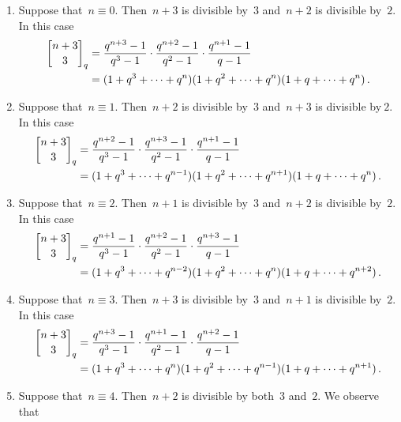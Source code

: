 \documentclass[a4paper,11pt]{scrartcl}
\begin{document}
\begin{enumerate}[label = {Case \arabic*.}]
  \item
    Suppose that~$n \equiv 0$.
    Then~$n+3$ is divisible by~$3$ and~$n+2$ is divisible by~$2$.
    In this case
    \begin{align*}
      \qbinom{n+3}{3}_q
      &=
      \frac{ q^{n+3} - 1 }{ q^3 - 1 }
      \cdot
      \frac{ q^{n+2} - 1 }{ q^2 - 1 }
      \cdot
      \frac{ q^{n+1} - 1 }{ q - 1 }
      \\
      &=
      (1 + q^3 + \dotsb + q^n) (1 + q^2 + \dotsb + q^n) (1 + q + \dotsb + q^n) \,.
    \end{align*}
  \item
    Suppose that~$n \equiv 1$.
    Then~$n+2$ is divisible by~$3$ and~$n+3$ is divisible by$~2$.
    In this case
    \begin{align*}
      \qbinom{n+3}{3}_q
      &=
      \frac{ q^{n+2} - 1 }{ q^3 - 1 }
      \cdot
      \frac{ q^{n+3} - 1 }{ q^2 - 1 }
      \cdot
      \frac{ q^{n+1} - 1 }{ q - 1 }
      \\
      &=
      (1 + q^3 + \dotsb + q^{n-1}) (1 + q^2 + \dotsb + q^{n+1}) (1 + q + \dotsb + q^n) \,.
    \end{align*}
  \item
    Suppose that~$n \equiv 2$.
    Then~$n+1$ is divisible by~$3$ and~$n+2$ is divisible by~$2$.
    In this case
    \begin{align*}
      \qbinom{n+3}{3}_q
      &=
      \frac{ q^{n+1} - 1 }{ q^3 - 1 }
      \cdot
      \frac{ q^{n+2} - 1 }{ q^2 - 1 }
      \cdot
      \frac{ q^{n+3} - 1 }{ q - 1 }
      \\
      &=
      (1 + q^3 + \dotsb + q^{n-2}) (1 + q^2 + \dotsb + q^n) (1 + q + \dotsb + q^{n+2}) \,.
    \end{align*}
  \item
    Suppose that~$n \equiv 3$.
    Then~$n+3$ is divisible by~$3$ and~$n+1$ is divisible by~$2$.
    In this case
    \begin{align*}
      \qbinom{n+3}{3}_q
      &=
      \frac{ q^{n+3} - 1 }{ q^3 - 1 }
      \cdot
      \frac{ q^{n+1} - 1 }{ q^2 - 1 }
      \cdot
      \frac{ q^{n+2} - 1 }{ q - 1 }
      \\
      &=
      (1 + q^3 + \dotsb + q^n) (1 + q^2 + \dotsb + q^{n-1}) (1 + q + \dotsb + q^{n+1}) \,.
    \end{align*}
  \item
    Suppose that~$n \equiv 4$.
    Then~$n+2$ is divisible by both~$3$ and~$2$.
    We observe that

\end{enumerate}
\end{document}
